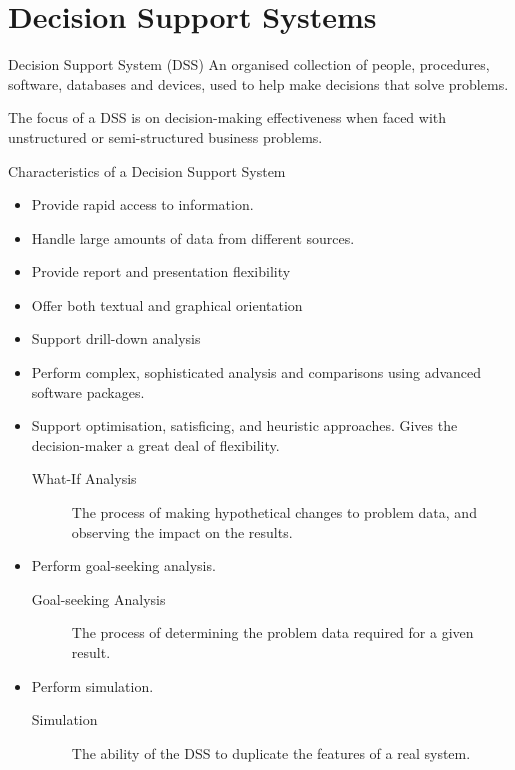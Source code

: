\documentclass[\main/notes.tex]{subfiles}
\begin{document}
		\section{Decision Support Systems}
			\begin{definition}{Decision Support System (DSS)}
				An organised collection of people, procedures, software, databases and devices, used to help make decisions that solve problems.

				The focus of a DSS is on decision-making effectiveness when faced with unstructured or semi-structured business problems.
			\end{definition}
			\begin{sidenote}{Characteristics of a Decision Support System}
				\begin{itemize}[nosep]
					\item Provide rapid access to information.
					\item Handle large amounts of data from different sources.
					\item Provide report and presentation flexibility
					\item Offer both textual and graphical orientation
					\item Support drill-down analysis
					\item Perform complex, sophisticated analysis and comparisons using advanced software packages.
					\item Support optimisation, satisficing, and heuristic approaches. Gives the decision-maker a great deal of flexibility.
						\begin{description}
							\item[What-If Analysis] The process of making hypothetical changes to problem data, and observing the impact on the results.
						\end{description}
					\item Perform goal-seeking analysis.
						\begin{description}
							\item[Goal-seeking Analysis] The process of determining the problem data required for a given result.
						\end{description}
					\item Perform simulation.
						\begin{description}
							\item[Simulation] The ability of the DSS to duplicate the features of a real system.
						\end{description}
				\end{itemize}
			\end{sidenote}
\end{document}
